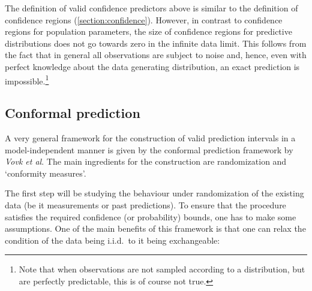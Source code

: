     \begin{remark}
        The definition of valid confidence predictors above is similar to the definition of confidence regions (\cref{section:confidence}). However, in contrast to confidence regions for population parameters, the size of confidence regions for predictive distributions does not go towards zero in the infinite data limit. This follows from the fact that in general all observations are subject to noise and, hence, even with perfect knowledge about the data generating distribution, an exact prediction is impossible.\footnote{Note that when observations are not sampled according to a distribution, but are perfectly predictable, this is of course not true.}
    \end{remark}

\subsection{Conformal prediction}

    A very general framework for the construction of valid prediction intervals in a model-independent manner is given by the conformal prediction framework by \textit{Vovk et al}. The main ingredients for the construction are randomization and `conformity measures'.

    The first step will be studying the behaviour under randomization of the existing data (be it measurements or past predictions). To ensure that the procedure satisfies the required confidence (or probability) bounds, one has to make some assumptions. One of the main benefits of this framework is that one can relax the condition of the data being i.i.d.~to it being exchangeable:

